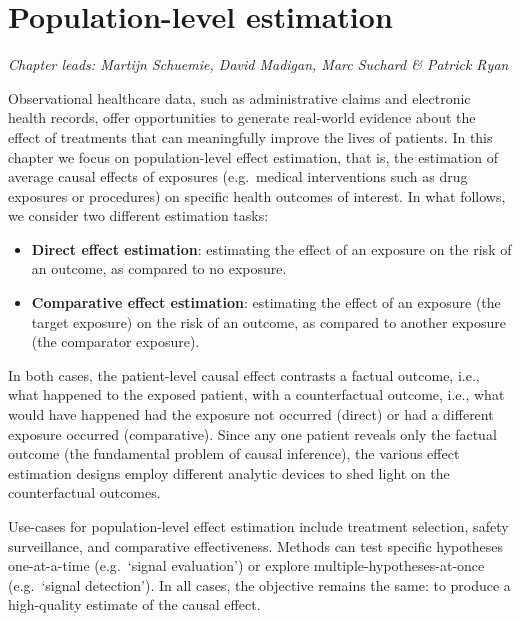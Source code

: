 \documentclass[11pt]{book}
\providecommand{\tightlist}{%
  \setlength{\itemsep}{0pt}\setlength{\parskip}{0pt}}
\theoremstyle{definition}
\theoremstyle{definition}
\theoremstyle{definition}
\theoremstyle{remark}
\begin{document}
\hypertarget{PopulationLevelEstimation}{%
\chapter{Population-level estimation}\label{PopulationLevelEstimation}}

\emph{Chapter leads: Martijn Schuemie, David Madigan, Marc Suchard \& Patrick Ryan}


Observational healthcare data, such as administrative claims and electronic health records, offer opportunities to generate real-world evidence about the effect of treatments that can meaningfully improve the lives of patients. In this chapter we focus on population-level effect estimation, that is, the estimation of average causal effects of exposures (e.g.~medical interventions such as drug exposures or procedures) on specific health outcomes of interest. In what follows, we consider two different estimation tasks:

\begin{itemize}
\tightlist
\item
  \textbf{Direct effect estimation}: estimating the effect of an exposure on the risk of an outcome, as compared to no exposure. 
\item
  \textbf{Comparative effect estimation}: estimating the effect of an exposure (the target exposure) on the risk of an outcome, as compared to another exposure (the comparator exposure). 
\end{itemize}

In both cases, the patient-level causal effect contrasts a factual outcome, i.e., what happened to the exposed patient, with a counterfactual outcome, i.e., what would have happened had the exposure not occurred (direct) or had a different exposure occurred (comparative). Since any one patient reveals only the factual outcome (the fundamental problem of causal inference), the various effect estimation designs employ different analytic devices to shed light on the counterfactual outcomes. 

Use-cases for population-level effect estimation include treatment selection, safety surveillance, and comparative effectiveness. Methods can test specific hypotheses one-at-a-time (e.g.~`signal evaluation') or explore multiple-hypotheses-at-once (e.g.~`signal detection'). In all cases, the objective remains the same: to produce a high-quality estimate of the causal effect.  
\end{document}

